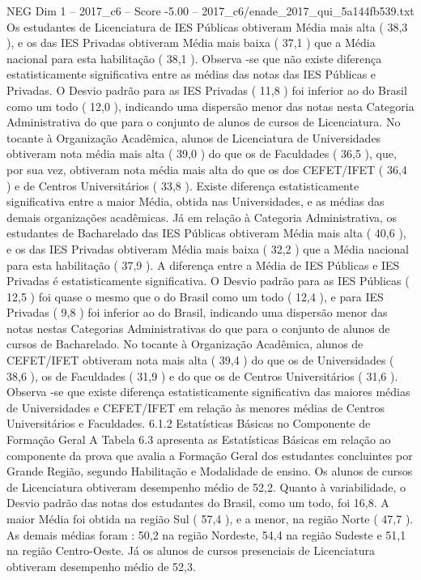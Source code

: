 \begin{textsample}{NEG Dim 1 – 2017\_c6 – Score -5.00 – 2017\_c6/enade\_2017\_qui\_5a144fb539.txt}
Os estudantes de Licenciatura de IES Públicas obtiveram Média mais alta ( 38,3 ), e os das IES Privadas obtiveram Média mais baixa ( 37,1 ) que a Média nacional para esta habilitação ( 38,1 ).
Observa -se que não existe diferença estatisticamente significativa entre as médias das notas das IES Públicas e Privadas.
O Desvio padrão para as IES Privadas ( 11,8 ) foi inferior ao do Brasil como um todo ( 12,0 ), indicando uma dispersão menor das notas nesta Categoria Administrativa do que para o conjunto de alunos de cursos de Licenciatura.
No tocante à Organização Acadêmica, alunos de Licenciatura de Universidades obtiveram nota média mais alta ( 39,0 ) do que os de Faculdades ( 36,5 ), que, por sua vez, obtiveram nota média mais alta do que os dos CEFET/IFET ( 36,4 ) e de Centros Universitários ( 33,8 ).
Existe diferença estatisticamente significativa entre a maior Média, obtida nas Universidades, e as médias das demais organizações acadêmicas.
Já em relação à Categoria Administrativa, os estudantes de Bacharelado das IES Públicas obtiveram Média mais alta ( 40,6 ), e os das IES Privadas obtiveram Média mais baixa ( 32,2 ) que a Média nacional para esta habilitação ( 37,9 ).
A diferença entre a Média de IES Públicas e IES Privadas é estatisticamente significativa.
O Desvio padrão para as IES Públicas ( 12,5 ) foi quase o mesmo que o do Brasil como um todo ( 12,4 ), e para IES Privadas ( 9,8 ) foi inferior ao do Brasil, indicando uma dispersão menor das notas nestas Categorias Administrativas do que para o conjunto de alunos de cursos de Bacharelado.
No tocante à Organização Acadêmica, alunos de CEFET/IFET obtiveram nota mais alta ( 39,4 ) do que os de Universidades ( 38,6 ), os de Faculdades ( 31,9 ) e do que os de Centros Universitários ( 31,6 ).
Observa -se que existe diferença estatisticamente significativa das maiores médias de Universidades e CEFET/IFET em relação às menores médias de Centros Universitários e Faculdades. 6.1.2 Estatísticas Básicas no Componente de Formação Geral A Tabela 6.3 apresenta as Estatísticas Básicas em relação ao componente da prova que avalia a Formação Geral dos estudantes concluintes por Grande Região, segundo Habilitação e Modalidade de ensino.
Os alunos de cursos de Licenciatura obtiveram desempenho médio de 52,2.
Quanto à variabilidade, o Desvio padrão das notas dos estudantes do Brasil, como um todo, foi 16,8.
A maior Média foi obtida na região Sul ( 57,4 ), e a menor, na região Norte ( 47,7 ).
As demais médias foram : 50,2 na região Nordeste, 54,4 na região Sudeste e 51,1 na região Centro-Oeste.
Já os alunos de cursos presenciais de Licenciatura obtiveram desempenho médio de 52,3.

\end{textsample}
